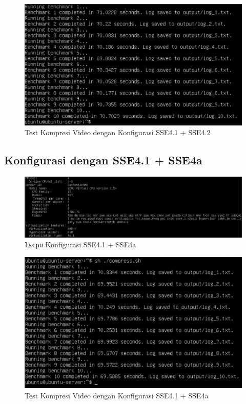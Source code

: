 \begin{figure}
    \centering
    \includegraphics[width=1\textwidth]
    {assets/pics/video-compression-test/sse4.1,sse4.2.jpeg}
    \caption{Test Kompresi Video dengan Konfigurasi SSE4.1 + SSE4.2}
    \label{fig:video_compression_test_sse4.1,sse4.2}
\end{figure}

\subsection{Konfigurasi dengan SSE4.1 + SSE4a}
\begin{figure}
    \centering
    \includegraphics[width=1\textwidth]
    {assets/pics/video-compression-test/lscpu_sse4.1,sse4a.jpeg}
    \caption{\texttt{lscpu} Konfigurasi SSE4.1 + SSE4a}
    \label{fig:lscpu_video_compression_test_sse4.1,sse4a}
\end{figure}

\begin{figure}
    \centering
    \includegraphics[width=1\textwidth]
    {assets/pics/video-compression-test/sse4.1,sse4a.jpeg}
    \caption{Test Kompresi Video dengan Konfigurasi SSE4.1 + SSE4a}
    \label{fig:video_compression_test_sse4.1,sse4a}
\end{figure}

